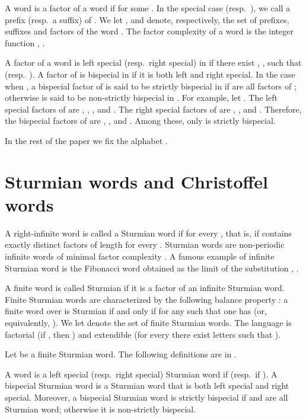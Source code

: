 \documentclass{llncs}
\begin{document}
A word  is a factor of a word  if  for some . In the special case  (resp.~), we call  a prefix (resp.~a suffix) of . We let ,  and  denote, respectively, the set of prefixes, suffixes and factors of the word . The factor complexity of a word  is the integer function ,  . 

A factor  of a word  is left special (resp.~right special) in  if there exist , , such that  (resp.~). A factor  of  is bispecial in  if it is both left and right special. In the case when , a bispecial factor  of  is said to be strictly bispecial in  if  are all factors of ; otherwise  is said to be non-strictly bispecial in . For example, let . The left special factors of  are , , ,  and . The right special factors of  are , ,  and . Therefore, the bispecial factors of  are , ,  and . Among these, only  is strictly bispecial.

In the rest of the paper we fix the alphabet .

\section{Sturmian words and Christoffel words}\label{sec:StCh}


A right-infinite word  is called a Sturmian word if  for every , that is, if  contains exactly  distinct factors of length  for every . Sturmian words are non-periodic infinite words of minimal factor complexity \cite{CoHe73}.
A famous example of infinite Sturmian word is the Fibonacci word  obtained as the limit of the substitution , . 

A finite word is called Sturmian if it is a factor of an infinite Sturmian word. Finite Sturmian words are characterized by the following balance property \cite{DuGB90}: a finite word  over  is Sturmian if and only if for any  such that  one has  (or, equivalently, ). We let  denote the set of finite Sturmian words. The language  is factorial (if , then ) and extendible (for every  there exist letters  such that ).

Let  be a finite Sturmian word. The following definitions are in \cite{DelMi94}. 

\begin{definition}
A word   is a  left special (resp.~right special) Sturmian word if  (resp.~if ). A bispecial Sturmian word is a Sturmian word that is both left special and right special. Moreover, a bispecial Sturmian word is strictly bispecial if  and  are all Sturmian word; otherwise it is non-strictly bispecial. 
\end{definition}
\end{document}
